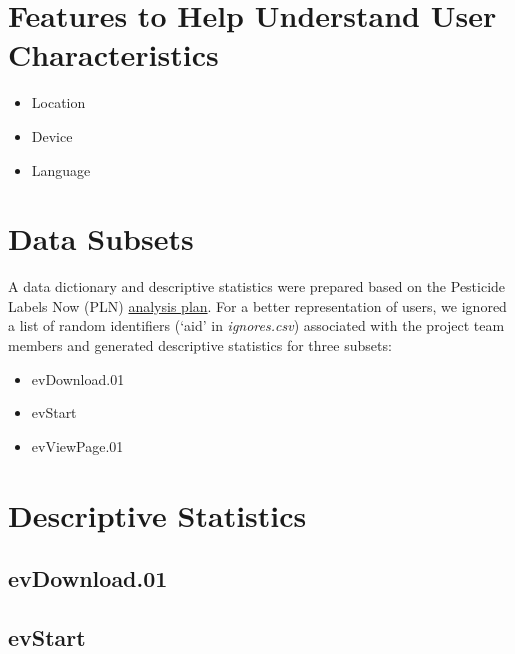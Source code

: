 \documentclass[
]{article}
\providecommand{\tightlist}{%
  \setlength{\itemsep}{0pt}\setlength{\parskip}{0pt}}
\begin{document}
\hypertarget{features-to-help-understand-user-characteristics}{%
\section{Features to Help Understand User
Characteristics}\label{features-to-help-understand-user-characteristics}}

\begin{itemize}
\tightlist
\item
  Location
\item
  Device
\item
  Language
\end{itemize}

\hypertarget{data-subsets}{%
\section{Data Subsets}\label{data-subsets}}

A data dictionary and descriptive statistics were prepared based on the
Pesticide Labels Now (PLN)
\href{https://docs.google.com/document/d/1mUHPYdpWljCWroODGenUjYlyae2ZWwqN4MScBLXlr2U/edit}{analysis
plan}. For a better representation of users, we ignored a list of random
identifiers (`aid' in \emph{ignores.csv}) associated with the project
team members and generated descriptive statistics for three subsets:

\begin{itemize}
\tightlist
\item
  evDownload.01
\item
  evStart
\item
  evViewPage.01
\end{itemize}

\hypertarget{descriptive-statistics}{%
\section{Descriptive Statistics}\label{descriptive-statistics}}

\hypertarget{evdownload.01}{%
\subsection{evDownload.01}\label{evdownload.01}}

\hypertarget{evstart}{%
\subsection{evStart}\label{evstart}}
\end{document}
